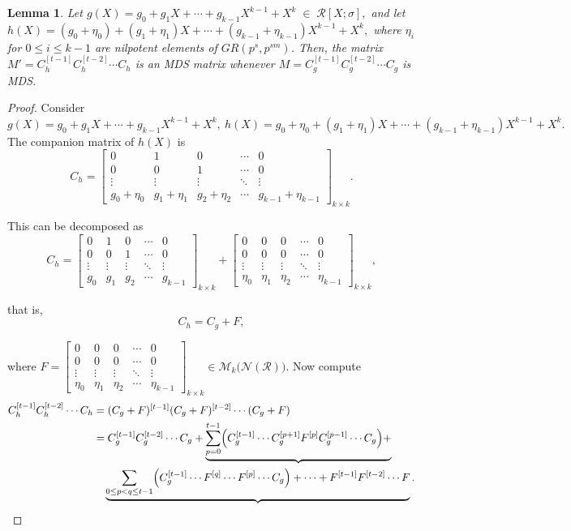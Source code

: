 \documentclass[11pt]{article}
\newtheorem{lemma}{Lemma}
\begin{document}
\begin{lemma}\label{LEMMA3}
Let 
\(
g(X)=g_0+g_1X+\cdots+g_{k-1}X^{k-1}+X^k \;\in\; \mathcal{R}[X;\sigma],
\)
and let
\(
h(X)=(g_0+\eta_0)+(g_1+\eta_1)X+\cdots+(g_{k-1}+\eta_{k-1})X^{k-1}+X^k,
\)
where $\eta_i$ for $0\leq i \leq k-1$ are nilpotent elements of $GR(p^s,p^{sm})$. Then, the matrix
\(
M' = C_h^{[t-1]} C_h^{[t-2]} \cdots C_h
\)
is an \textup{MDS} matrix whenever
\(
M = C_g^{[t-1]} C_g^{[t-2]} \cdots C_g
\)
is \textup{MDS}.
\end{lemma}
\begin{proof}
Consider
\(
g(X)=g_0+g_1X+\cdots+g_{k-1}X^{k-1}+X^k,~ 
h(X)=g_0+\eta_0+(g_1+\eta_1)X+\cdots+(g_{k-1}+\eta_{k-1})X^{k-1}+X^k.
\)
The companion matrix of $h(X)$ is
\[
C_h=\begin{bmatrix}
0 & 1 & 0 & \cdots & 0\\
0 & 0 & 1 & \cdots & 0\\
\vdots & \vdots & \vdots & \ddots & \vdots\\
g_0+\eta_0 & g_1+\eta_1 & g_2+\eta_2 & \cdots & g_{k-1}+\eta_{k-1}
\end{bmatrix}_{k\times k}.
\]

This can be decomposed as
\[
C_h = 
\begin{bmatrix}
0 & 1 & 0 & \cdots & 0\\
0 & 0 & 1 & \cdots & 0\\
\vdots & \vdots & \vdots & \ddots & \vdots\\
g_0 & g_1 & g_2 & \cdots & g_{k-1}
\end{bmatrix}_{k\times k}
+
\begin{bmatrix}
0 & 0 & 0 & \cdots & 0\\
0 & 0 & 0 & \cdots & 0\\
\vdots & \vdots & \vdots & \ddots & \vdots\\
\eta_0 & \eta_1 & \eta_2 & \cdots & \eta_{k-1}
\end{bmatrix}_{k\times k},
\]

that is,
\[
C_h = C_g + F,
\]

where $F=\begin{bmatrix}
0 & 0 & 0 & \cdots & 0\\
0 & 0 & 0 & \cdots & 0\\
\vdots & \vdots & \vdots & \ddots & \vdots\\
\eta_0 & \eta_1 & \eta_2 & \cdots & \eta_{k-1}
\end{bmatrix}_{k\times k} \in \mathcal{M}_k\!\Big(\mathcal{N}(\mathcal{R})\Big)$. Now compute
\begin{align}\label{eq:Mh}
C_h^{[t-1]} C_h^{[t-2]}\cdots C_h
&=(C_g+F)^{[t-1]}(C_g+F)^{[t-2]}\cdots(C_g+F) \notag\\
&= C_g^{[t-1]}C_g^{[t-2]}\cdots C_g 
+\underbrace{ \sum_{p=0}^{t-1}\!\Big(C_g^{[t-1]}\cdots C_g^{[p+1]}F^{[p]}C_g^{[p-1]}\cdots C_g\Big)+} \notag\\
&\quad \underbrace{ \sum_{0\le p<q\le t-1}\!\Big(C_g^{[t-1]}\cdots F^{[q]}\cdots F^{[p]}\cdots C_g\Big) 
+ \cdots + F^{[t-1]}F^{[t-2]}\cdots F}. 
\end{align}


\end{proof}
\end{document}
